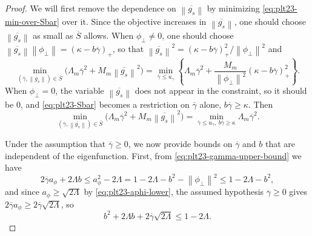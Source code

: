 ﻿\documentclass[11pt]{article}
\numberwithin{equation}{section}
\newcommand{\norm}[1]{\left\lVert #1\right\rVert}
\newcommand{\pos}[1]{\left(#1\right)_{+}}
\begin{document}
\begin{proof}
  We will first remove the dependence on $\overline{\norm{g_s}}$ by minimizing \eqref{eq:plt23-min-over-Sbar} over it.
  Since the objective increases in $\overline{\norm{g_s}}$, one should choose $\overline{\norm{g_s}}$ as small as $\overline S$ allows.
  When $\phi_\perp\ne0$, one should choose $\overline{\norm{g_s}}\norm{\phi_\perp}=\pos{\kappa-b\overline\gamma}$, so that $\overline{\norm{g_s}}^2=\pos{\kappa-b\overline\gamma}^2/\norm{\phi_\perp}^2$ and
  \begin{equation}\label{eq:plt23-one-d-t}
    \min_{(\overline\gamma,\overline{\norm{g_s}})\in\overline S}
    \bigl(\Lambda_m\overline\gamma^2+M_m\overline{\norm{g_s}}^2\bigr)
    =\min_{\overline\gamma\le u_\gamma}
    \left\{
    \Lambda_m\overline\gamma^2
    +\frac{M_m}{\norm{\phi_\perp}^2}\pos{\kappa-b\overline\gamma}^2
    \right\}.
  \end{equation}
  When $\phi_\perp=0$, the variable $\overline{\norm{g_s}}$ does not appear in the constraint, so it should be $0$, and \eqref{eq:plt23-Sbar} becomes a restriction on $\overline\gamma$ alone, $b\overline\gamma\ge\kappa$.
  Then
  \begin{equation}\label{eq:plt23-one-d-t-zero}
    \min_{(\overline\gamma,\overline{\norm{g_s}})\in\overline S}
    \bigl(\Lambda_m\overline\gamma^2+M_m\overline{\norm{g_s}}^2\bigr)
    =\min_{\overline\gamma\le u_\gamma,\ b\overline\gamma\ge\kappa}
    \Lambda_m\overline\gamma^2.
  \end{equation}

  Under the assumption that $\overline\gamma\ge0$, we now provide bounds on $\overline\gamma$ and $b$ that are independent of the eigenfunction.
  First, from \eqref{eq:plt23-gamma-upper-bound} we have
  \[
    2\overline\gamma a_\phi+2\Lambda b
    \le a_\phi^2-2\Lambda=1-2\Lambda-b^2-\norm{\phi_\perp}^2
    \le1-2\Lambda-b^2,
  \]
  and since $a_\phi\ge\sqrt{2\Lambda}$ by \eqref{eq:plt23-aphi-lower}, the assumed hypothesis $\overline\gamma\ge0$ gives $2\overline\gamma a_\phi\ge2\overline\gamma\sqrt{2\Lambda}$, so
  \begin{equation}\label{eq:plt23-b-gamma-budget}
    b^2+2\Lambda b+2\overline\gamma\sqrt{2\Lambda}\le1-2\Lambda.
  \end{equation}


\end{proof}
\end{document}
